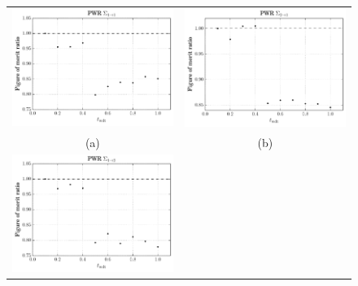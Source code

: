 
\begin{figure}[hbtp]
  \centering
  \begin{tabular}{cc}
  \includegraphics[scale=0.6]{images/results/pwr_inf_sp0_grp_1} &
  \includegraphics[scale=0.6]{images/results/pwr_inf_sp0_grp_2} \\
    (a) & (b) \\
  \includegraphics[scale=0.6]{images/results/pwr_inf_sp0_grp_3} &

\end{tabular}
\end{figure}
